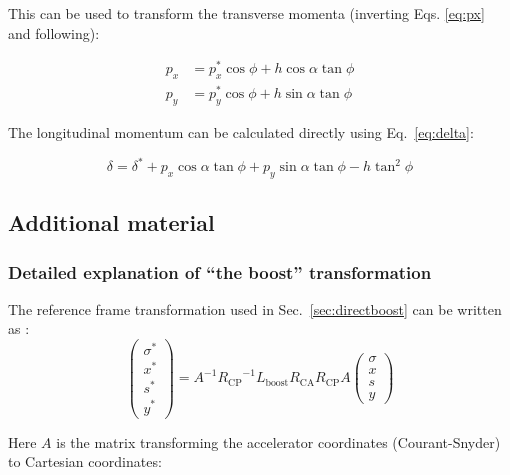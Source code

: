 This can be used to transform the transverse momenta (inverting Eqs. \ref{eq:px} and following):

\begin{align}
p_x &= p_x^* \cos \phi + h \cos \alpha \tan \phi\\
p_y &= p_y^* \cos \phi + h \sin \alpha \tan \phi
\end{align}

The longitudinal momentum can be calculated directly using Eq.~\ref{eq:delta}:

\begin{equation}
\delta = \delta^* + p_x \cos \alpha \tan \phi + p_y \sin \alpha \tan \phi - h \tan^2 \phi
\end{equation}

\subsection{Additional material}



\subsubsection{Detailed explanation of ``the boost'' transformation}
\label{app:boost}
The reference frame transformation used in Sec.~\ref{sec:directboost} can be written as \cite{hirata, beam_beam}:
\begin{equation}
\left( \begin{matrix}
\sigma^*\\
x^*\\
s^*\\
y^*
\end{matrix} \right) = A^{-1}{R_{\mathrm{CP}}}^{-1}L_{\mathrm{boost}}R_{\mathrm{CA}}R_{\mathrm{CP}}A
\left( \begin{matrix}
\sigma\\
x\\
s\\
y
\end{matrix} \right) 
\end{equation}

Here $A$ is the matrix transforming the accelerator coordinates (Courant-Snyder) to Cartesian coordinates:

